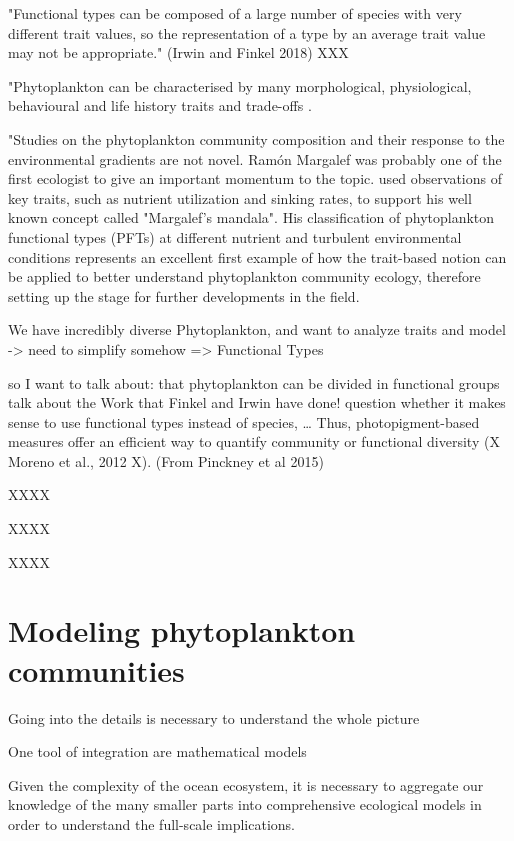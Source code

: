 "Functional types can be composed of a large number of species with very different trait values, so the representation of a type by an average trait value may not be appropriate." (Irwin and Finkel 2018)
XXX

"Phytoplankton can be characterised by many morphological, physiological, behavioural and life history traits and trade-offs \citep{Litchman2008, Litchman2010}.

"Studies on the phytoplankton community composition and their response to the environmental gradients are not novel. Ramón Margalef was probably one of the first ecologist to give an important momentum to the topic.  \citep{Margalef1978} used observations of key traits, such as nutrient utilization and sinking rates, to support his well known concept called "Margalef's mandala". His classification of phytoplankton functional types (PFTs) at different nutrient and turbulent environmental conditions represents an excellent first example of how the trait-based notion can be applied to better understand phytoplankton community ecology, therefore setting up the stage for further developments in the field.

We have incredibly diverse Phytoplankton, and want to analyze traits and model -> need to simplify somehow => Functional Types

so I want to talk about:
that phytoplankton can be divided in functional groups
talk about the Work that Finkel and Irwin have done! 
question whether it makes sense to use functional types instead of species, …
Thus, photopigment-based measures offer an efficient way to quantify community or functional diversity (X Moreno et al., 2012 X). (From Pinckney et al 2015)



XXXX


XXXX


XXXX


\section{Modeling phytoplankton communities}
Going into the details is necessary to understand the whole picture

One tool of integration are mathematical models

Given the complexity of the ocean ecosystem, it is necessary to aggregate our knowledge of the many smaller parts into comprehensive ecological models in order to understand the full-scale implications. 

